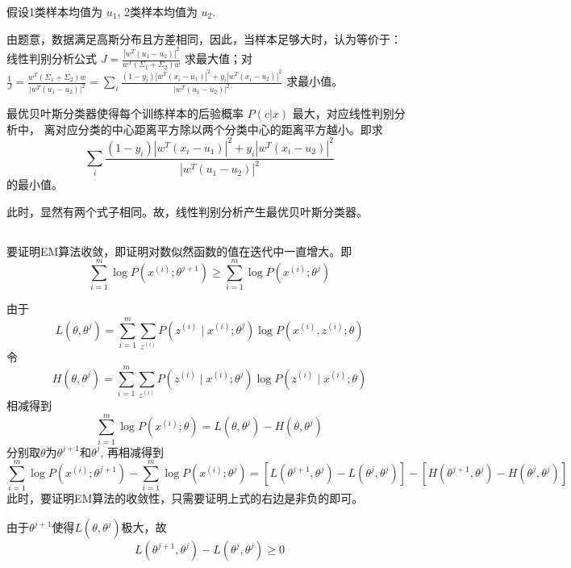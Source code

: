 \documentclass[UTF8,a4paper,AutoFakeBold,AutoFakeSlant]{article}
\begin{document}
假设1类样本均值为 $u_1$, 2类样本均值为 $u_2$.

由题意，数据满足高斯分布且方差相同，因此，当样本足够大时，认为等价于：
线性判别分析公式
$ J=\frac{\left|w^{T}\left(u_{1}-u_{2}\right)\right|^{2}}{w^{T}\left(\Sigma_{1}+\Sigma_{2}\right) w} $
求最大值；对
$ \frac{1}{J}=\frac{w^{T}\left(\Sigma_{1}+\Sigma_{2}\right) w}{\left|w^{T}\left(u_{1}-u_{2}\right)\right|^{2}}=\sum_{i} \frac{\left(1-y_{i}\right)\left|w^{T}\left(x_{i}-u_{1}\right)\right|^{2}+y_{i}\left|w^{T}\left(x_{i}-u_{2}\right)\right|^{2}}{\left|w^{T}\left(u_{1}-u_{2}\right)\right|^{2}} $
求最小值。

最优贝叶斯分类器使得每个训练样本的后验概率 $P(c|x)$ 最大，对应线性判别分析中，
离对应分类的中心距离平方除以两个分类中心的距离平方越小。即求
$$ \sum_{i} \frac{\left(1-y_{i}\right)\left|w^{T}\left(x_{i}-u_{1}\right)\right|^{2}+y_{i}\left|w^{T}\left(x_{i}-u_{2}\right)\right|^{2}}{\left|w^{T}\left(u_{1}-u_{2}\right)\right|^{2}} $$
的最小值。

此时，显然有两个式子相同。故，线性判别分析产生最优贝叶斯分类器。



\subsection{}

要证明EM算法收敛，即证明对数似然函数的值在迭代中一直增大。即
$$ \sum_{i=1}^{m} \log P\left(x^{(i)} ; \theta^{j+1}\right) \geq \sum_{i=1}^{m} \log P\left(x^{(i)} ; \theta^{j}\right) $$

由于
$$ L\left(\theta, \theta^{j}\right)=\sum_{i=1}^{m} \sum_{z^{(i)}} P\left(z^{(i)} \mid x^{(i)} ; \theta^{j}\right) \log P\left(x^{(i)}, z^{(i)} ; \theta\right) $$
令
$$ H\left(\theta, \theta^{j}\right)=\sum_{i=1}^{m} \sum_{z^{(i)}} P\left(z^{(i)} \mid x^{(i)} ; \theta^{j}\right) \log P\left(z^{(i)} \mid x^{(i)} ; \theta\right) $$
相减得到
$$ \sum_{i=1}^{m} \log P\left(x^{(i)} ; \theta\right)=L\left(\theta, \theta^{j}\right)-H\left(\theta, \theta^{j}\right) $$
分别取$\theta$为$\theta^{j+1}$和$\theta^{j}$, 再相减得到
$$ \sum_{i=1}^{m} \log P\left(x^{(i)} ; \theta^{j+1}\right)-\sum_{i=1}^{m} \log P\left(x^{(i)} ; \theta^{j}\right)=\left[L\left(\theta^{j+1}, \theta^{j}\right)-L\left(\theta^{j}, \theta^{j}\right)\right]-\left[H\left(\theta^{j+1}, \theta^{j}\right)-H\left(\theta^{j}, \theta^{j}\right)\right] $$
此时，要证明EM算法的收敛性，只需要证明上式的右边是非负的即可。

由于$\theta^{j+1}$使得$L(\theta, \theta^{j})$极大，故
$$ L\left(\theta^{j+1}, \theta^{j}\right)-L\left(\theta^{j}, \theta^{j}\right) \geq 0 $$
\end{document}

